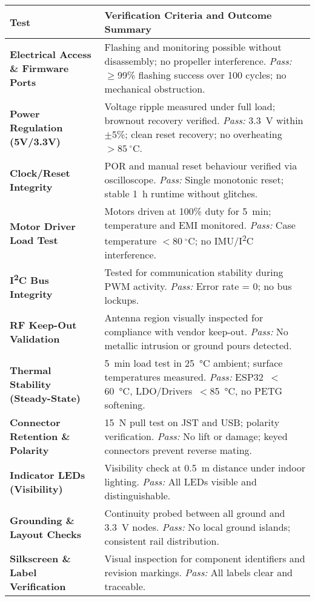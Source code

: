 \begin{longtable}{@{}p{4.2cm} p{11cm}@{}}
\toprule
\textbf{Test} & \textbf{Verification Criteria and Outcome Summary} \\ 
\midrule
\textbf{Electrical Access \& Firmware Ports} &
Flashing and monitoring possible without disassembly; no propeller interference. \newline
\textit{Pass:} $\geq$99\% flashing success over 100 cycles; no mechanical obstruction. \\ 
\midrule
\textbf{Power Regulation (5V/3.3V)} &
Voltage ripple measured under full load; brownout recovery verified. \newline
\textit{Pass:} 3.3~V within $\pm$5\%; clean reset recovery; no overheating $>85~^{\circ}$C. \\ 
\midrule
\textbf{Clock/Reset Integrity} &
POR and manual reset behaviour verified via oscilloscope. \newline
\textit{Pass:} Single monotonic reset; stable 1~h runtime without glitches. \\ 
\midrule
\textbf{Motor Driver Load Test} &
Motors driven at 100\% duty for 5~min; temperature and EMI monitored. \newline
\textit{Pass:} Case temperature $<80~^{\circ}$C; no IMU/I\textsuperscript{2}C interference. \\ 
\midrule
\textbf{I\textsuperscript{2}C Bus Integrity} &
Tested for communication stability during PWM activity. \newline
\textit{Pass:} Error rate = 0; no bus lockups. \\ 
\midrule
\textbf{RF Keep-Out Validation} &
Antenna region visually inspected for compliance with vendor keep-out. \newline
\textit{Pass:} No metallic intrusion or ground pours detected. \\ 
\midrule
\textbf{Thermal Stability (Steady-State)} &
5~min load test in 25~°C ambient; surface temperatures measured. \newline
\textit{Pass:} ESP32~$<$60~°C, LDO/Drivers~$<$85~°C, no PETG softening. \\ 
\midrule
\textbf{Connector Retention \& Polarity} &
15~N pull test on JST and USB; polarity verification. \newline
\textit{Pass:} No lift or damage; keyed connectors prevent reverse mating. \\ 
\midrule
\textbf{Indicator LEDs (Visibility)} &
Visibility check at 0.5~m distance under indoor lighting. \newline
\textit{Pass:} All LEDs visible and distinguishable. \\ 
\midrule
\textbf{Grounding \& Layout Checks} &
Continuity probed between all ground and 3.3~V nodes. \newline
\textit{Pass:} No local ground islands; consistent rail distribution. \\ 
\midrule
\textbf{Silkscreen \& Label Verification} &
Visual inspection for component identifiers and revision markings. \newline
\textit{Pass:} All labels clear and traceable. \\ 
\bottomrule
\end{longtable}

